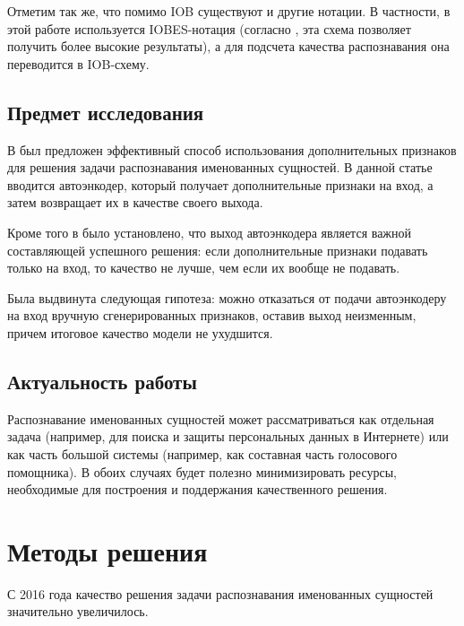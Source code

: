 \documentclass[a4paper,14pt]{extarticle}
\begin{document}
Отметим так же, что помимо IOB существуют и другие нотации. В частности, в этой работе используется IOBES-нотация (согласно \cite{ratinov-roth-2009-design}, \cite{1511.08308} эта схема позволяет получить более высокие результаты), а для подсчета качества распознавания она переводится в IOB-схему.

\subsection{Предмет исследования}

В \cite{1808.09075} был предложен эффективный способ использования дополнительных признаков для решения задачи распознавания именованных сущностей. В данной статье вводится автоэнкодер, который получает дополнительные признаки на вход, а затем возвращает их в качестве своего выхода.

Кроме того в \cite{1808.09075} было установлено, что выход автоэнкодера является важной составляющей успешного решения: если дополнительные признаки подавать только на вход, то качество не лучше, чем если их вообще не подавать.

Была выдвинута следующая гипотеза: можно отказаться от подачи автоэнкодеру на вход вручную сгенерированных признаков, оставив выход неизменным, причем итоговое качество модели не ухудшится.

\subsection{Актуальность работы}

Распознавание именованных сущностей может рассматриваться как отдельная задача (например, для поиска и защиты персональных данных в Интернете) или как часть большой системы (например, как составная часть голосового помощника). В обоих случаях будет полезно минимизировать ресурсы, необходимые для построения и поддержания качественного решения.

\clearpage

\section{Методы решения}

С 2016 года качество решения задачи распознавания именованных сущностей значительно увеличилось.
\end{document}
